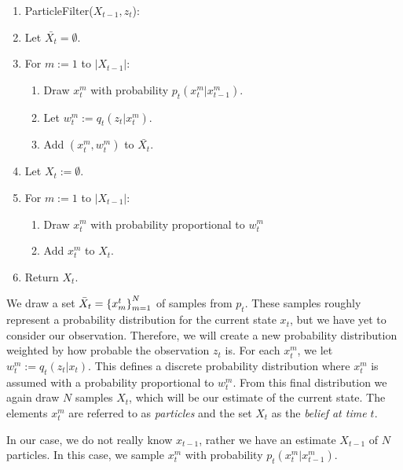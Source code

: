 \begin{enumerate}
\item ParticleFilter($X_{t-1}, z_t$):
\item Let $\bar{X_t} = \emptyset$.
\item For $m:=1$ to $\left|X_{t-1}\right|$:
  \begin{enumerate}
  \item Draw $x_t^m$ with probability $p_t\left(x_t^m | x_{t-1}^m\right)$.
  \item Let $w_t^m := q_t\left(z_t | x_t^m\right)$.
  \item Add $(x_t^m, w_t^m)$ to $\bar{X_t}$.
  \end{enumerate}
\item Let $X_t := \emptyset$.
\item For $m:=1$ to $\left|X_{t-1}\right|$:
  \begin{enumerate}
    \item Draw $x_t^m$ with probability proportional to $w_t^m$
    \item Add $x_t^m$ to $X_t$.
  \end{enumerate}
\item Return $X_t$.
\end{enumerate}


We draw a set $\bar{X}_t = \left\{x_{m}^{t}\right\}_{m=1}^{N}$ of samples from $p_t$. These samples roughly represent a probability distribution for the current state $x_t$, but we have yet to consider our observation. Therefore, we will create a new probability distribution weighted by how probable the observation $z_t$ is. For each $x_t^m$, we let $w_t^m := q_t\left(z_t | x_t\right)$. This defines a discrete probability distribution where $x_t^m$ is assumed with a probability proportional to $w_t^m$. From this final distribution we again draw $N$ samples $X_t$, which will be our estimate of the current state. The elements $x_t^m$ are referred to as \emph{particles} and the set $X_t$ as the \emph{belief at time $t$}.

In our case, we do not really know $x_{t-1}$, rather we have an estimate $X_{t-1}$ of $N$ particles. In this case, we sample $x_t^m$ with probability $p_t\left(x_t^m | x_{t-1}^m\right)$.



